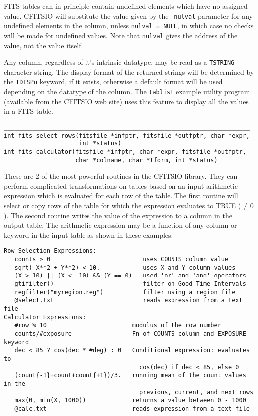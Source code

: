 \documentclass[11pt]{article}
\begin{document}
FITS tables can in principle contain undefined elements which have no
assigned value.  CFITSIO will substitute the value given by the {\tt
nulval} parameter for  any undefined elements in the column, unless
{\tt nulval = NULL}, in which case no checks will be made for undefined
values. Note that {\tt nulval} gives the address of the value, not the
value itself.

Any column, regardless of it's intrinsic datatype, may be read as a
{\tt TSTRING} character string. The display format of the returned
strings will be determined by the {\tt TDISPn} keyword, if it exists,
otherwise a default format will be used depending on the datatype of
the column.  The {\tt tablist} example utility program (available from
the CFITSIO web site) uses this feature to display all the values in a
FITS table.

\begin{verbatim}
_____________________________________________________________________
int fits_select_rows(fitsfile *infptr, fitsfile *outfptr, char *expr,
                     int *status)
int fits_calculator(fitsfile *infptr, char *expr, fitsfile *outfptr,
                    char *colname, char *tform, int *status) 
\end{verbatim}

These are 2 of the most powerful routines in the CFITSIO library.  They
can perform complicated transformations on tables based on an input
arithmetic expression which is evaluated for each row of the table.
The first routine will select or copy rows of the table for which the
expression evaluates to TRUE ($ \neq 0$).  The second routine writes
the value of the expression to a column in the output table.  The
arithmetic expression may be a function of any column or keyword in the
input table as shown in these examples:

\begin{verbatim}
Row Selection Expressions:
   counts > 0                          uses COUNTS column value
   sqrt( X**2 + Y**2) < 10.            uses X and Y column values
   (X > 10) || (X < -10) && (Y == 0)   used 'or' and 'and' operators  
   gtifilter()                         filter on Good Time Intervals
   regfilter("myregion.reg")           filter using a region file
   @select.txt                         reads expression from a text file
Calculator Expressions:
   #row % 10                        modulus of the row number
   counts/#exposure                 Fn of COUNTS column and EXPOSURE keyword
   dec < 85 ? cos(dec * #deg) : 0   Conditional expression: evaluates to
                                      cos(dec) if dec < 85, else 0
   (count{-1}+count+count{+1})/3.   running mean of the count values in the
                                      previous, current, and next rows
   max(0, min(X, 1000))             returns a value between 0 - 1000
   @calc.txt                        reads expression from a text file
\end{verbatim}
\end{document}
